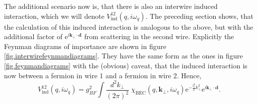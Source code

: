 The additional scenario now is, that there is also an interwire induced interaction, which we will denote $V_{\text{ind}}^{12}(q,i\omega_q)$. The preceding section shows, that the calculation of this induced interaction is analogous to the above, but with the additional factor of $\text{e}^{i\mathbf{k}_\perp\cdot \mathbf{d}}$ from scattering in the second wire. Explicitly the Feynman diagrams of importance are shown in figure \ref{fig.interwirefeynmandiagrams}. They have the same form as the ones in figure \ref{fig.feynmandiagrams} with the (obvious) caveat, that the induced interaction is now between a fermion in wire 1 and a fermion in wire 2. Hence,
\begin{equation}
V_{\text{ind}}^{12}(q,i\omega_q) = g_{BF}^2\int\frac{d^2k_\perp}{(2\pi)^2}\; \chi_\text{BEC}(q,\mathbf{k}_\perp,i\omega_q)\text{e}^{-\frac{l_t^2}{2}k_\perp^2}\text{e}^{i\mathbf{k}_\perp\cdot \mathbf{d}}. 
\label{eq.VFF12indXBEC} 
\end{equation}

